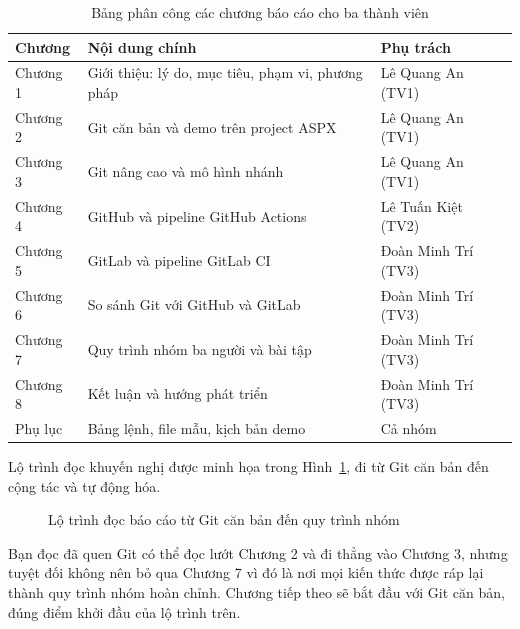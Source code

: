 \begin{table}[H]
\centering
\caption{Bảng phân công các chương báo cáo cho ba thành viên}
\label{tab:c1-phan-cong}
\begin{tabular}{l p{8cm} l}
\toprule
Chương & Nội dung chính & Phụ trách \\
\midrule
Chương 1 & Giới thiệu: lý do, mục tiêu, phạm vi, phương pháp & Lê Quang An (TV1) \\
Chương 2 & Git căn bản và demo trên project ASPX & Lê Quang An (TV1) \\
Chương 3 & Git nâng cao và mô hình nhánh & Lê Quang An (TV1) \\
Chương 4 & GitHub và pipeline GitHub Actions & Lê Tuấn Kiệt (TV2) \\
Chương 5 & GitLab và pipeline GitLab CI & Đoàn Minh Trí (TV3) \\
Chương 6 & So sánh Git với GitHub và GitLab & Đoàn Minh Trí (TV3) \\
Chương 7 & Quy trình nhóm ba người và bài tập & Đoàn Minh Trí (TV3) \\
Chương 8 & Kết luận và hướng phát triển & Đoàn Minh Trí (TV3) \\
Phụ lục & Bảng lệnh, file mẫu, kịch bản demo & Cả nhóm \\
\bottomrule
\end{tabular}
\end{table}
Lộ trình đọc khuyến nghị được minh họa trong Hình~\ref{fig:c1-lo-trinh}, đi từ Git căn bản đến cộng tác và tự động hóa.
\begin{figure}[H]
\centering
{}
\caption{Lộ trình đọc báo cáo từ Git căn bản đến quy trình nhóm}
\label{fig:c1-lo-trinh}
\end{figure}
Bạn đọc đã quen Git có thể đọc lướt Chương 2 và đi thẳng vào Chương 3, nhưng tuyệt đối không nên bỏ qua Chương 7 vì đó là nơi mọi kiến thức được ráp lại thành quy trình nhóm hoàn chỉnh.
Chương tiếp theo sẽ bắt đầu với Git căn bản, đúng điểm khởi đầu của lộ trình trên.
